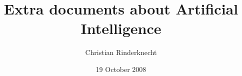 \documentclass[11pt]{article}
\title{Extra documents about Artificial Intelligence}
\author{Christian Rinderknecht}
\date{19 October 2008}
\begin{document}
\frame{\maketitle}



%


\end{document}
